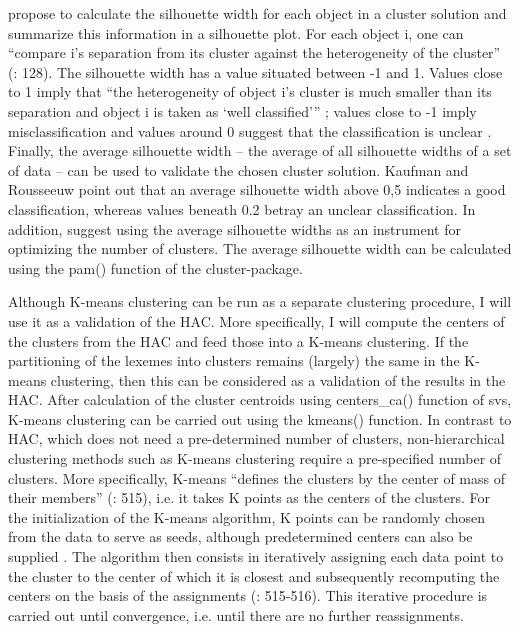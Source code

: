 \citet{kaufman_finding_1990} propose to calculate the silhouette width for each object in a cluster solution and summarize this information in a silhouette plot. For each object i, one can “compare i’s separation from its cluster against the heterogeneity of the cluster” (\citealt{everitt_cluster_2011}: 128). The silhouette width has a value situated between -1 and 1. Values close to 1 imply that “the heterogeneity of object i’s cluster is much smaller than its separation and object i is taken as ‘well classified’” \citep[128]{everitt_cluster_2011}; values close to -1 imply misclassification and values around 0 suggest that the classification is unclear \citep[128]{everitt_cluster_2011}. Finally, the average silhouette width – the average of all silhouette widths of a set of data – can be used to validate the chosen cluster solution. Kaufman and Rousseeuw point out that an average silhouette width above 0,5 indicates a good classification, whereas values beneath 0.2 betray an unclear classification. In addition, \citet[129]{everitt_cluster_2011} suggest using the average silhouette widths as an instrument for optimizing the number of clusters. The average silhouette width can be calculated using the pam() function of the cluster{}-package.



Although K-means clustering can be run as a separate clustering procedure, I will use it as a validation of the HAC. More specifically, I will compute the centers of the clusters from the HAC and feed those into a K-means clustering. If the partitioning of the lexemes into clusters remains (largely) the same in the K-means clustering, then this can be considered as a validation of the results in the HAC. After calculation of the cluster centroids using centers\_ca() function of svs, K-means clustering can be carried out using the kmeans() function. In contrast to HAC, which does not need a pre-determined number of clusters, non-hierarchical clustering methods such as K-means clustering require a pre-specified number of clusters. More specifically, K-means “defines the clusters by the center of mass of their members” (\citealt{manning_foundations_1999}: 515), i.e. it takes K points as the centers of the clusters. For the initialization of the K-means algorithm, K points can be randomly chosen from the data to serve as seeds, although predetermined centers can also be supplied \citep[515]{manning_foundations_1999}. The algorithm then consists in iteratively assigning each data point to the cluster to the center of which it is closest \citep[515]{manning_foundations_1999} and subsequently recomputing the centers on the basis of the assignments (\citealt{manning_foundations_1999}: 515-516). This iterative procedure is carried out until convergence, i.e. until there are no further reassignments.


